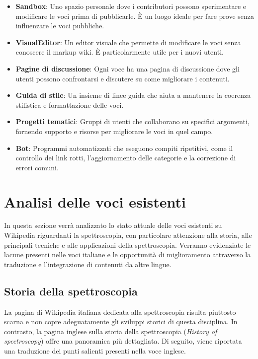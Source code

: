 \documentclass[12pt,a4paper]{report}
\begin{document}
\begin{itemize}
    \item \textbf{Sandbox}: Uno spazio personale dove i contributori possono sperimentare e modificare le voci prima di pubblicarle. È un luogo ideale per fare prove senza influenzare le voci pubbliche.
    \item \textbf{VisualEditor}: Un editor visuale che permette di modificare le voci senza conoscere il markup wiki. È particolarmente utile per i nuovi utenti.
    \item \textbf{Pagine di discussione}: Ogni voce ha una pagina di discussione dove gli utenti possono confrontarsi e discutere su come migliorare i contenuti.
    \item \textbf{Guida di stile}: Un insieme di linee guida che aiuta a mantenere la coerenza stilistica e formattazione delle voci.
    \item \textbf{Progetti tematici}: Gruppi di utenti che collaborano su specifici argomenti, fornendo supporto e risorse per migliorare le voci in quel campo.
    \item \textbf{Bot}: Programmi automatizzati che eseguono compiti ripetitivi, come il controllo dei link rotti, l'aggiornamento delle categorie e la correzione di errori comuni.
\end{itemize}

\section{Analisi delle voci esistenti}

In questa sezione verrà analizzato lo stato attuale delle voci esistenti su Wikipedia riguardanti la spettroscopia, con particolare attenzione alla storia, alle principali tecniche e alle applicazioni della spettroscopia. Verranno evidenziate le lacune presenti nelle voci italiane e le opportunità di miglioramento attraverso la traduzione e l'integrazione di contenuti da altre lingue.

\subsection{Storia della spettroscopia}

La pagina di Wikipedia italiana dedicata alla spettroscopia risulta piuttosto scarna e non copre adeguatamente gli sviluppi storici di questa disciplina. In contrasto, la pagina inglese sulla storia della spettroscopia (\textit{History of spectroscopy}) offre una panoramica più dettagliata. Di seguito, viene riportata una traduzione dei punti salienti presenti nella voce inglese.
\end{document}
